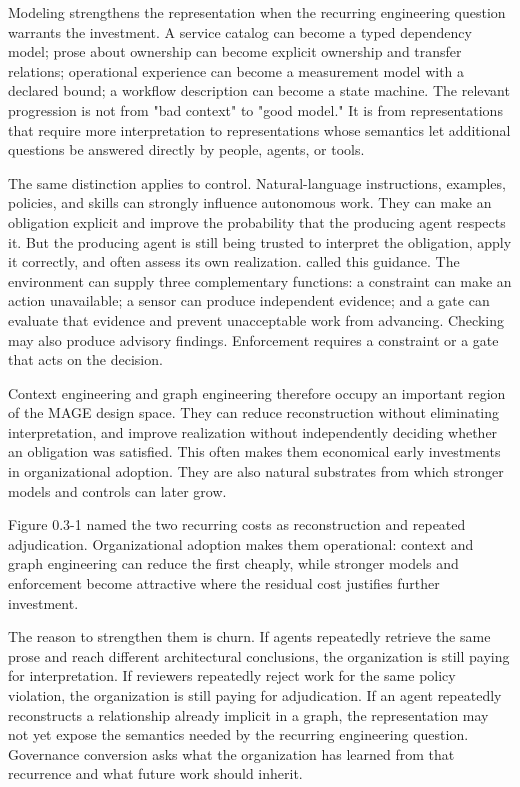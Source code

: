 Modeling strengthens the representation when the recurring engineering question warrants the investment. A service catalog can become a typed dependency model; prose about ownership can become explicit ownership and transfer relations; operational experience can become a measurement model with a declared bound; a workflow description can become a state machine. The relevant progression is not from "bad context" to "good model." It is from representations that require more interpretation to representations whose semantics let additional questions be answered directly by people, agents, or tools.

The same distinction applies to control. Natural-language instructions, examples, policies, and skills can strongly influence autonomous work. They can make an obligation explicit and improve the probability that the producing agent respects it. But the producing agent is still being trusted to interpret the obligation, apply it correctly, and often assess its own realization.  called this guidance. The environment can supply three complementary functions: a constraint can make an action unavailable; a sensor can produce independent evidence; and a gate can evaluate that evidence and prevent unacceptable work from advancing. Checking may also produce advisory findings. Enforcement requires a constraint or a gate that acts on the decision.

Context engineering and graph engineering therefore occupy an important region of the MAGE design space. They can reduce reconstruction without eliminating interpretation, and improve realization without independently deciding whether an obligation was satisfied. This often makes them economical early investments in organizational adoption. They are also natural substrates from which stronger models and controls can later grow.

Figure 0.3-1 named the two recurring costs as reconstruction and repeated adjudication. Organizational adoption makes them operational: context and graph engineering can reduce the first cheaply, while stronger models and enforcement become attractive where the residual cost justifies further investment.

The reason to strengthen them is churn. If agents repeatedly retrieve the same prose and reach different architectural conclusions, the organization is still paying for interpretation. If reviewers repeatedly reject work for the same policy violation, the organization is still paying for adjudication. If an agent repeatedly reconstructs a relationship already implicit in a graph, the representation may not yet expose the semantics needed by the recurring engineering question. Governance conversion asks what the organization has learned from that recurrence and what future work should inherit.


